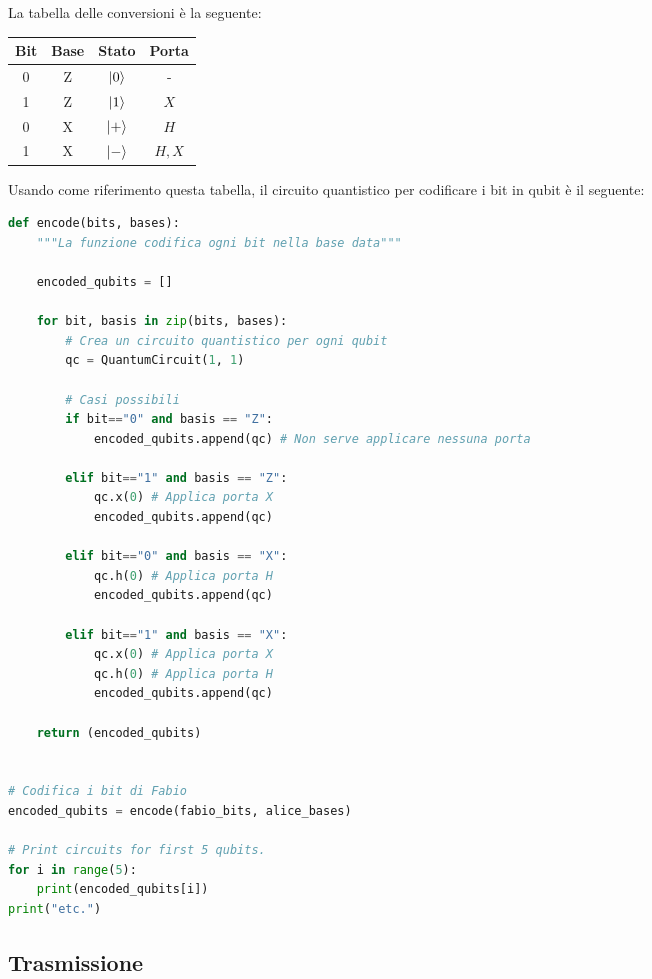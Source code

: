 \documentclass[a4paper]{article}
\begin{document}
La tabella delle conversioni è la seguente:
\begin{table}[H]
  \centering
  \begin{tabular}{|c|c|c|c|}
    \hline
    \textbf{Bit} & \textbf{Base} & \textbf{Stato} & \textbf{Porta} \\ \hline
    0 & Z & $\ket{0}$ & - \\ \hline
    1 & Z & $\ket{1}$ & \( X \) \\ \hline
    0 & X & $\ket{+}$ & \( H \) \\ \hline
    1 & X & $\ket{-}$ & \( H,X \) \\ \hline
  \end{tabular}
\end{table}
Usando come riferimento questa tabella, il circuito quantistico per codificare i bit
in qubit è il seguente:
\begin{lstlisting}[language=Python]
def encode(bits, bases):
    """La funzione codifica ogni bit nella base data"""
    
    encoded_qubits = []
    
    for bit, basis in zip(bits, bases):
        # Crea un circuito quantistico per ogni qubit
        qc = QuantumCircuit(1, 1)
        
        # Casi possibili
        if bit=="0" and basis == "Z":
            encoded_qubits.append(qc) # Non serve applicare nessuna porta

        elif bit=="1" and basis == "Z":
            qc.x(0) # Applica porta X
            encoded_qubits.append(qc)

        elif bit=="0" and basis == "X":
            qc.h(0) # Applica porta H
            encoded_qubits.append(qc)

        elif bit=="1" and basis == "X":
            qc.x(0) # Applica porta X
            qc.h(0) # Applica porta H
            encoded_qubits.append(qc)
            
    return (encoded_qubits)


# Codifica i bit di Fabio
encoded_qubits = encode(fabio_bits, alice_bases)

# Print circuits for first 5 qubits.
for i in range(5):
    print(encoded_qubits[i])
print("etc.")
\end{lstlisting}

\subsection{Trasmissione}
    
\end{document}

